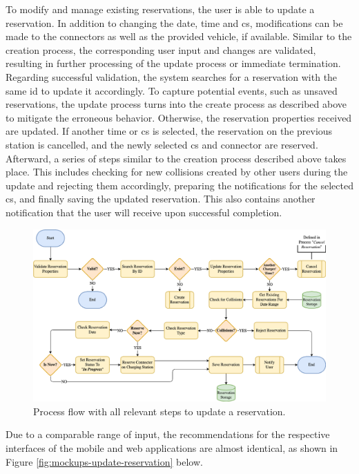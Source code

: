To modify and manage existing reservations, the user is able to update a reservation. In addition to changing the date, time and \acrshort{cs}, modifications can be made to the connectors as well as the provided vehicle, if available. 
Similar to the creation process, the corresponding user input and changes are validated, resulting in further processing of the update process or immediate termination.
Regarding successful validation, the system searches for a reservation with the same \acrshort{id} to update it accordingly.
To capture potential events, such as unsaved reservations, the update process turns into the create process as described above to mitigate the erroneous behavior.
Otherwise, the reservation properties received are updated. If another time or \acrshort{cs} is selected, the reservation on the previous station is cancelled, and the newly selected \acrshort{cs} and connector are reserved.
Afterward, a series of steps similar to the creation process described above takes place. This includes checking for new collisions created by other users during the update and rejecting them accordingly, preparing the notifications for the selected \acrshort{cs}, and finally saving the updated reservation.
This also contains another notification that the user will receive upon successful completion.

\begin{figure}[h]
    \centering
    \includegraphics[scale=0.4]{resources/images/main/5_design/processes/ReservationUpdate.png}
    \caption{Process flow with all relevant steps to update a reservation.}
    \label{fig:update-reservation-flowchart}
\end{figure}

\noindent Due to a comparable range of input, the recommendations for the respective interfaces of the mobile and web applications are almost identical, as shown in Figure \ref{fig:mockups-update-reservation} below.

